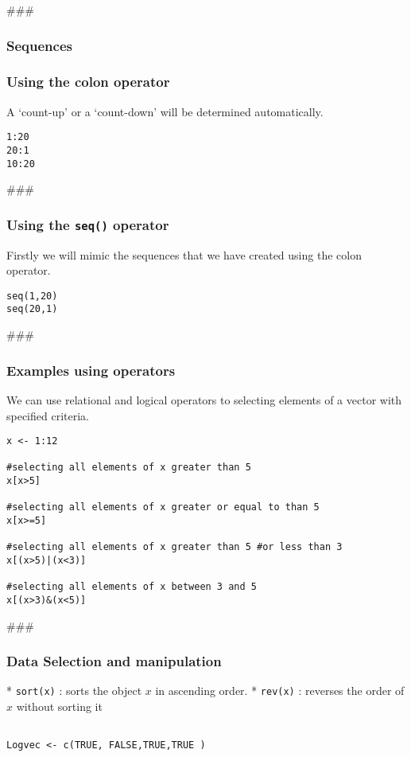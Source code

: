 \begin{frame}[fragile]
\begin{itemize}
### 

\frametitle{Sequences}
\frametitle{Using the colon operator}
A `count-up' or a `count-down' will be determined automatically.
\begin{framed}
\begin{verbatim}
1:20
20:1
10:20
\end{verbatim}
\end{framed}

### 
\frametitle{Using the \texttt{seq()} operator}
Firstly we will mimic the sequences that we have created using the colon operator.
\begin{framed}
\begin{verbatim}
seq(1,20)
seq(20,1)
\end{verbatim}
\end{framed}


### 
\frametitle{Examples using operators}

We can use relational and logical operators to selecting elements
of a vector with specified criteria.

\begin{framed}
\begin{verbatim}
x <- 1:12

#selecting all elements of x greater than 5
x[x>5]

#selecting all elements of x greater or equal to than 5
x[x>=5]

#selecting all elements of x greater than 5 #or less than 3
x[(x>5)|(x<3)]

#selecting all elements of x between 3 and 5
x[(x>3)&(x<5)]
\end{verbatim}
\end{framed}

### 
\frametitle{Data Selection and manipulation}


*  \texttt{sort(x)} : sorts the object $x$ in ascending order.
*  \texttt{rev(x)} : reverses the order of $x$ without sorting it





\begin{framed}
\begin{verbatim}

Logvec <- c(TRUE, FALSE,TRUE,TRUE )

\end{verbatim}
\end{framed}

\end{itemize}
\end{frame}
